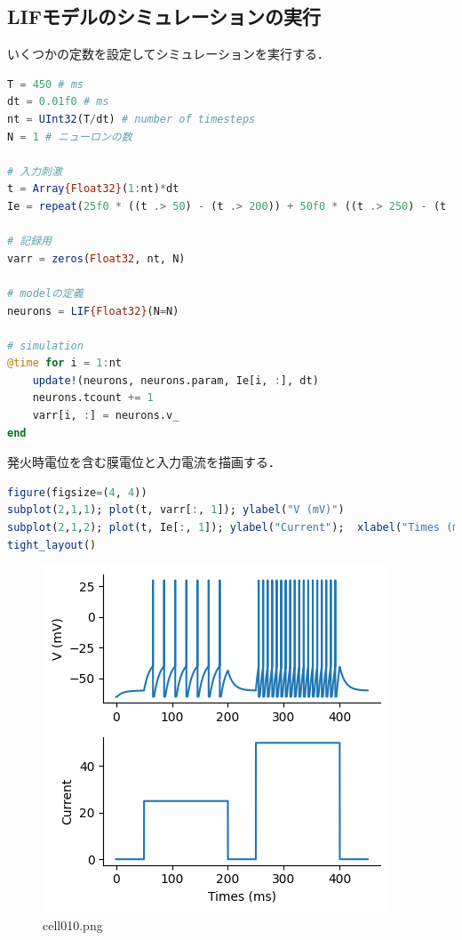 \subsection{LIFモデルのシミュレーションの実行}
いくつかの定数を設定してシミュレーションを実行する．
\begin{lstlisting}[language=julia]
T = 450 # ms
dt = 0.01f0 # ms
nt = UInt32(T/dt) # number of timesteps
N = 1 # ニューロンの数

# 入力刺激
t = Array{Float32}(1:nt)*dt
Ie = repeat(25f0 * ((t .> 50) - (t .> 200)) + 50f0 * ((t .> 250) - (t .> 400)), 1, N)  # injection current

# 記録用
varr = zeros(Float32, nt, N)

# modelの定義
neurons = LIF{Float32}(N=N)

# simulation
@time for i = 1:nt
    update!(neurons, neurons.param, Ie[i, :], dt)
    neurons.tcount += 1
    varr[i, :] = neurons.v_
end
\end{lstlisting}
発火時電位を含む膜電位と入力電流を描画する．
\begin{lstlisting}[language=julia]
figure(figsize=(4, 4))
subplot(2,1,1); plot(t, varr[:, 1]); ylabel("V (mV)")
subplot(2,1,2); plot(t, Ie[:, 1]); ylabel("Current");  xlabel("Times (ms)")
tight_layout()
\end{lstlisting}
\begin{figure}[ht]
	\centering
	\includegraphics[scale=0.8, max width=\linewidth]{./fig/neuron-model/lif/cell010.png}
	\caption{cell010.png}
	\label{cell010.png}
\end{figure}
